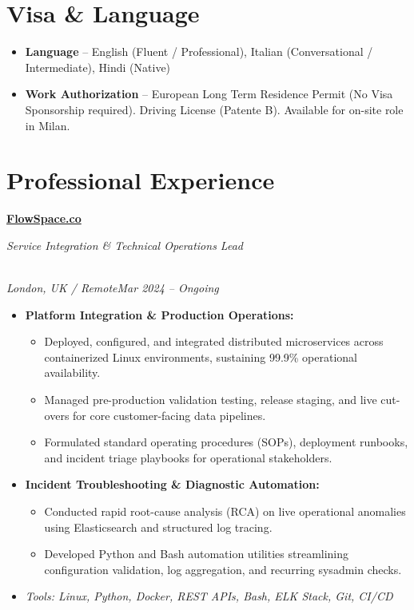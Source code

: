 \documentclass[a4paper,10pt]{article}
\newcommand{\role}[4]{\vspace{3pt}\noindent\hspace{0.6em}\parbox[t]{0.38\textwidth}{\raggedright\textbf{#1}}\hfill\parbox[t]{0.58\textwidth}{\raggedleft\textit{#2}}\\{\textit{#3}\hfill\textit{#4}}\vspace{1pt}}
\begin{document}
\section{Visa \& Language}
\begin{itemize}
\item \textbf{Language} -- English (Fluent / Professional), Italian (Conversational / Intermediate), Hindi (Native)
\item \textbf{Work Authorization} -- European Long Term Residence Permit (No Visa Sponsorship required). Driving License (Patente B). Available for on-site role in Milan.
\end{itemize}

\section{Professional Experience}
\role{\href{https://flowspace.co}{FlowSpace.co}}{Service Integration \& Technical Operations Lead}{London, UK / Remote}{Mar 2024 -- Ongoing}
\begin{itemize}
\item \textbf{Platform Integration \& Production Operations:}
\begin{itemize}[label=--]
\item Deployed, configured, and integrated distributed microservices across containerized Linux environments, sustaining 99.9\% operational availability.
\item Managed pre-production validation testing, release staging, and live cut-overs for core customer-facing data pipelines.
\item Formulated standard operating procedures (SOPs), deployment runbooks, and incident triage playbooks for operational stakeholders.
\end{itemize}
\item \textbf{Incident Troubleshooting \& Diagnostic Automation:}
\begin{itemize}[label=--]
\item Conducted rapid root-cause analysis (RCA) on live operational anomalies using Elasticsearch and structured log tracing.
\item Developed Python and Bash automation utilities streamlining configuration validation, log aggregation, and recurring sysadmin checks.
\end{itemize}
\item \textit{Tools: Linux, Python, Docker, REST APIs, Bash, ELK Stack, Git, CI/CD}
\end{itemize}
\end{document}
